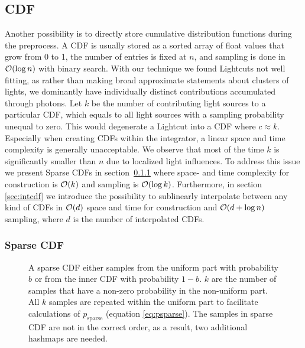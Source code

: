 \subsection{CDF}

Another possibility is to directly store cumulative distribution functions during the preprocess. A CDF is usually stored as a sorted array of float values that grow from 0 to 1, the number of entries is fixed at $n$, and sampling is done in $\mathcal{O}(\log{n})$ with binary search. With our technique we found Lightcuts not well fitting, as rather than making broad approximate statements about clusters of lights, we dominantly have individually distinct contributions accumulated through photons. Let $k$ be the number of contributing light sources to a particular CDF, which equals to all light sources with a sampling probability unequal to zero. This would degenerate a Lightcut into a CDF where $c \approx k$. Especially when creating CDFs within the integrator, a linear space and time complexity is generally unacceptable. We observe that most of the time $k$ is significantly smaller than $n$ due to localized light influences. To address this issue we present Sparse CDFs in section~\ref{sec:sparse} where space- and time complexity for construction is $\mathcal{O}(k)$ and sampling is $\mathcal{O}(\log{k})$. Furthermore, in section \ref{sec:intcdf} we introduce the possibility to sublinearly interpolate between any kind of CDFs in $\mathcal{O}(d)$ space and time for construction and $\mathcal{O}(d + \log{n})$ sampling, where $d$ is the number of interpolated CDFs.

\subsubsection{Sparse CDF}
\label{sec:sparse}
\begin{figure}[htb] 
	\centering
    
    \caption{A sparse CDF either samples from the uniform part with probability $b$ or from the inner CDF with probability $1-b$. $k$ are the number of samples that have a non-zero probability in the non-uniform part. All $k$ samples are repeated within the uniform part to facilitate calculations of $p_{\text{sparse}}$ (equation \ref{eq:psparse}). The samples in sparse CDF are not in the correct order, as a result, two additional hashmaps are needed.} 
    \label{fig:sparseCDF}
\end{figure}


